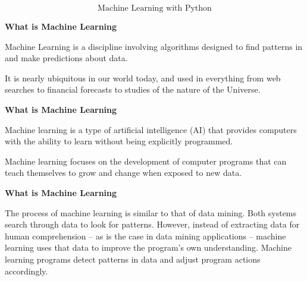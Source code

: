\documentclass[MASTER.tex]{subfiles}
\begin{document}
 
 
 
  
  \huge
  \[ \mbox{Machine Learning with Python} \]
  
 
 
 
\textbf{What is Machine Learning}
 
\item Machine Learning is a discipline involving algorithms designed to find patterns in and make predictions about data. 
\item It is nearly ubiquitous in our world today, and used in everything from web searches to financial forecasts to studies of the nature of the Universe. 
 
 

 


 
 
\textbf{What is Machine Learning}
 
  
Machine learning is a type of artificial intelligence (AI) that provides computers with the ability to learn without being explicitly programmed. 
\item Machine learning focuses on the development of computer programs that can teach themselves to grow and change when exposed to new data. 
 
 

 
 
\textbf{What is Machine Learning}
 
  The process of machine learning is similar to that of data mining. Both systems search through data to look for patterns. 
  However, instead of extracting data for human comprehension -- as is the case in data mining applications -- machine learning uses that data to improve the program's own understanding.  Machine learning programs detect patterns in data and adjust program actions accordingly. 
 
 
% 
%
% 
 
\end{document}
